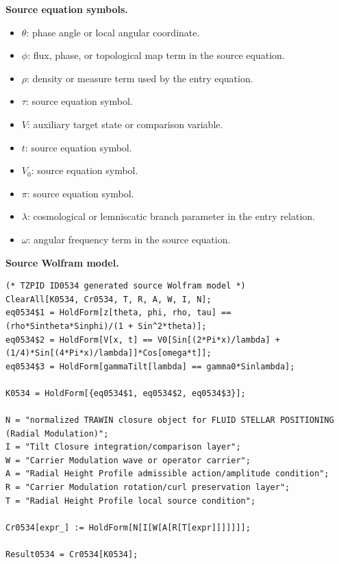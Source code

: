 \begin{minipage}[t]{0.49\linewidth}
\begingroup
\small
\raggedright
\textbf{Source equation symbols.}\par
\begin{itemize}[leftmargin=1.35em,itemsep=1pt,topsep=1pt,parsep=0pt]
    \item $\theta$: phase angle or local angular coordinate.
    \item $\phi$: flux, phase, or topological map term in the source equation.
    \item $\rho$: density or measure term used by the entry equation.
    \item $\tau$: source equation symbol.
    \item $V$: auxiliary target state or comparison variable.
    \item $t$: source equation symbol.
    \item $V_{0}$: source equation symbol.
    \item $\pi$: source equation symbol.
    \item $\lambda$: cosmological or lemniscatic branch parameter in the entry relation.
    \item $\omega$: angular frequency term in the source equation.
\end{itemize}
\endgroup
\end{minipage}\hfill
\begin{minipage}[t]{0.47\linewidth}
\begingroup
\scriptsize
\raggedright
\textbf{Source Wolfram model.}\par
\begin{Verbatim}[fontsize=\tiny,breaklines=true,breakanywhere=true]
(* TZPID ID0534 generated source Wolfram model *)
ClearAll[K0534, Cr0534, T, R, A, W, I, N];
eq0534$1 = HoldForm[z[theta, phi, rho, tau] == (rho*Sintheta*Sinphi)/(1 + Sin^2*theta)];
eq0534$2 = HoldForm[V[x, t] == V0[Sin[(2*Pi*x)/lambda] + (1/4)*Sin[(4*Pi*x)/lambda]]*Cos[omega*t]];
eq0534$3 = HoldForm[gammaTilt[lambda] == gamma0*Sinlambda];

K0534 = HoldForm[{eq0534$1, eq0534$2, eq0534$3}];

N = "normalized TRAWIN closure object for FLUID STELLAR POSITIONING (Radial Modulation)";
I = "Tilt Closure integration/comparison layer";
W = "Carrier Modulation wave or operator carrier";
A = "Radial Height Profile admissible action/amplitude condition";
R = "Carrier Modulation rotation/curl preservation layer";
T = "Radial Height Profile local source condition";

Cr0534[expr_] := HoldForm[N[I[W[A[R[T[expr]]]]]]];

Result0534 = Cr0534[K0534];
\end{Verbatim}
\endgroup
\end{minipage}

